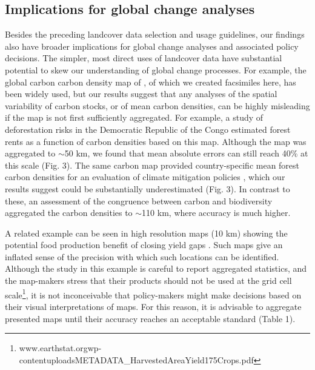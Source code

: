 \documentclass{pnastwo}
\begin{document}
\begin{article}
\subsection{Implications for global change analyses}
Besides the preceding landcover data selection and usage guidelines, our findings also have broader implications for global change analyses and associated policy decisions. The simpler, most direct uses of landcover data have substantial potential to skew our understanding of global change processes. For example, the global carbon carbon density map of \cite{ruesch_new_2008}, of which we created facsimiles here, has been widely used, but our results suggest that any analyses of the spatial variability of carbon stocks, or of mean carbon densities, can be highly misleading if the map is not first sufficiently aggregated. For example, a study of deforestation risks in the Democratic Republic of the Congo estimated forest rents as a function of carbon densities based on this map. Although the map was aggregated to $\sim$50 km, we found that mean absolute errors can still reach 40\% at this scale (Fig. 3). The same carbon map provided country-specific mean forest carbon densities for an evaluation of climate mitigation policies \cite{cattaneo_international_2010}, which our results suggest could be substantially underestimated (Fig. 3). In contrast to these, an assessment of the congruence between carbon and biodiversity \cite{strassburg_global_2010} aggregated the carbon densities to $\sim$110 km, where accuracy is much higher. 

A related example can be seen in high resolution maps (10 km) showing the potential food production benefit of closing yield gaps \cite[e.g. Figure 3 in][]{foley_solutions_2011}. Such maps give an inflated sense of the precision with which such locations can be identified. Although the study in this example is careful to report aggregated statistics, and the map-makers stress that their products should not be used at the grid cell scale\footnote{www.earthstat.org\/wp-content\/uploads\/METADATA\_HarvestedAreaYield175Crops.pdf}, it is not inconceivable that policy-makers might make decisions based on their visual interpretations of maps. For this reason, it is advisable to aggregate presented maps until their accuracy reaches an acceptable standard (Table 1). 


\end{article}
\end{document}
